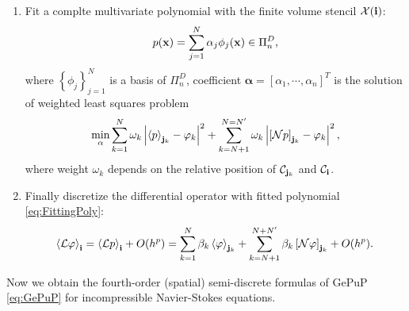 \begin{enumerate}
\item Fit a complte multivariate polynomial with the finite volume
  stencil $\mathcal{X}({\mathbf{i}})$:
  \begin{equation}
    \label{eq:FittingPoly}
    p({\mathbf{x}})=\sum\limits_{j=1}^N \alpha_j\phi_j({\mathbf{x}})\in\Pi_n^D,
  \end{equation}
  where $\left\{\phi_j\right\}_{j=1}^N$ is a basis of $\Pi_n^D$,
  coefficient $\mathbf{\alpha} = [\alpha_1,\cdots,\alpha_n]^T$ is the
  solution of weighted least squares problem
  \begin{equation}
    \label{eq:WeightedLSP}
    \min_{\alpha}\sum_{k=1}^N\omega_k\left|\left<p\right>_{{\mathbf{j}}_k} -
      \varphi_k\right|^2 +
    \sum_{k=N+1}^{N=N'}\omega_k\left|\left[\mathcal{N}p\right]_{{\mathbf{j}}_k} -
    \varphi_k\right|^2,
  \end{equation}
  where weight $\omega_k$ depends on the relative position of
  $\mathcal{C}_{{\mathbf{j}}_k}$ and $\mathcal{C}_{{\mathbf{i}}}$.
\item Finally discretize the differential operator with fitted
  polynomial \eqref{eq:FittingPoly}:
  \begin{equation}
    \label{eq:DiscreteOp}
    \left<\mathcal{L}\varphi\right>_{{\mathbf{i}}} =
    \left<\mathcal{L}p\right>_{{\mathbf{i}}}  + O(h^p) =
    \sum_{k=1}^N\beta_k\left<\varphi\right>_{{\mathbf{j}}_k}+
    \sum_{k=N+1}^{N+N'}\beta_k\left[\mathcal{N}\varphi\right]_{{\mathbf{j}}_k} + O(h^p).
  \end{equation}
\end{enumerate}

Now we obtain the fourth-order (spatial) semi-discrete formulas of
GePuP \eqref{eq:GePuP} for incompressible Navier-Stokes equations.

